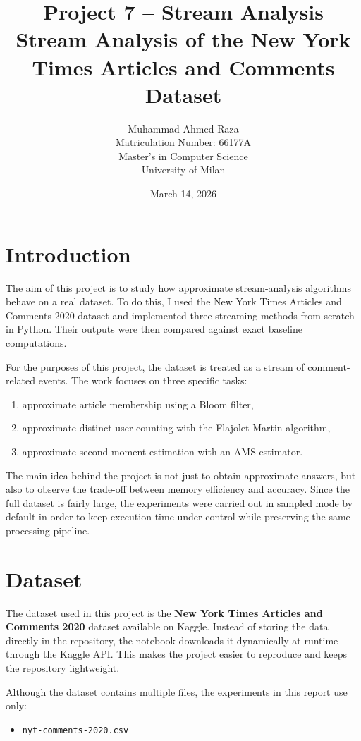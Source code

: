 \documentclass[11pt,a4paper]{article}
\title{\textbf{Project 7 -- Stream Analysis}\\
\vspace{0.3cm}
\large Stream Analysis of the New York Times Articles and Comments Dataset}
\author{
    Muhammad Ahmed Raza\\
    Matriculation Number: 66177A\\
    Master's in Computer Science\\
    University of Milan
}
\date{March 14, 2026}
\begin{document}
\maketitle

\section{Introduction}

The aim of this project is to study how approximate stream-analysis algorithms behave on a real dataset. To do this, I used the New York Times Articles and Comments 2020 dataset and implemented three streaming methods from scratch in Python. Their outputs were then compared against exact baseline computations.

For the purposes of this project, the dataset is treated as a stream of comment-related events. The work focuses on three specific tasks:
\begin{enumerate}
    \item approximate article membership using a Bloom filter,
    \item approximate distinct-user counting with the Flajolet-Martin algorithm,
    \item approximate second-moment estimation with an AMS estimator.
\end{enumerate}

The main idea behind the project is not just to obtain approximate answers, but also to observe the trade-off between memory efficiency and accuracy. Since the full dataset is fairly large, the experiments were carried out in sampled mode by default in order to keep execution time under control while preserving the same processing pipeline.

\section{Dataset}

The dataset used in this project is the \textbf{New York Times Articles and Comments 2020} dataset available on Kaggle. Instead of storing the data directly in the repository, the notebook downloads it dynamically at runtime through the Kaggle API. This makes the project easier to reproduce and keeps the repository lightweight.

Although the dataset contains multiple files, the experiments in this report use only:
\begin{itemize}
    \item \texttt{nyt-comments-2020.csv}
\end{itemize}
\end{document}

